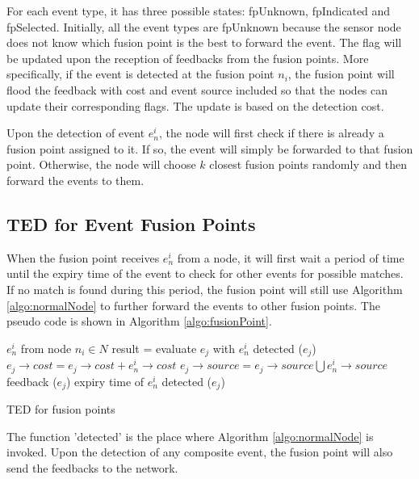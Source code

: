 For each event type, it has three possible states: fpUnknown, fpIndicated and fpSelected. Initially, all the event types are fpUnknown because the sensor node does not know which fusion point is the best to forward the event. The flag will be updated upon the reception of feedbacks from the fusion points. More specifically, if the event is detected at the fusion point \(n_i\), the fusion point will flood the feedback with cost and event source included so that the nodes can update their corresponding flags. The update is based on the detection cost.

Upon the detection of event \(e^i_n\), the node will first check if there is already a fusion point assigned to it. If so, the event will simply be forwarded to that fusion point. Otherwise, the node will choose \(k\) closest fusion points randomly and then forward the events to them.

\subsection{TED for Event Fusion Points}
When the fusion point receives \(e^i_n\) from a node, it will first wait a period of time until the expiry time of the event to check for other events for possible matches. If no match is found during this period, the fusion point will still use Algorithm \ref{algo:normalNode} to further forward the events to other fusion points. The pseudo code is shown in Algorithm \ref{algo:fusionPoint}.

\begin{algorithm}
\begin{algorithmic}[1]
\REQUIRE \(e^i_n\) from node \(n_i\in N\)
			\STATE result = evaluate \(e_j\) with \(e^i_n\)
				\STATE detected (\(e_j\))
				\STATE \(e_j\rightarrow cost=e_j\rightarrow cost+e^i_n\rightarrow cost\)
				\STATE \(e_j\rightarrow source=e_j\rightarrow source\bigcup e^i_n\rightarrow source\)
				\STATE feedback (\(e_j\))
			\ENDIF
		\ENDIF
	\ENDFOR
\REQUIRE expiry time of \(e^i_n\)
	\STATE detected (\(e_j\))
\end{algorithmic}
\caption{TED for fusion points}
\label{algo:fusionPoint}
\end{algorithm}

The function 'detected' is the place where Algorithm \ref{algo:normalNode} is invoked. Upon the detection of any composite event, the fusion point will also send the feedbacks to the network.

